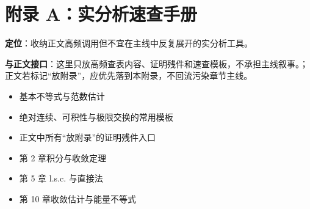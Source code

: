 \chapter{附录 A：实分析速查手册}

\label{app:a}

\begin{introduction}[内容提要]
        \item \textbf{定位}：收纳正文高频调用但不宜在主线中反复展开的实分析工具。
\item \textbf{与正文接口}：这里只放高频查表内容、证明残件和速查模板，不承担主线叙事。；正文若标记“放附录”，应优先落到本附录，不回流污染章节主线。
      \end{introduction}

\begin{definition}[收录范围]
        \begin{itemize}
  \item 基本不等式与范数估计
  \item 绝对连续、可积性与极限交换的常用模板
  \item 正文中所有“放附录”的证明残件入口
\end{itemize}
        \end{definition}

\begin{example}[使用时机]
        \begin{itemize}
  \item 第 2 章积分与收敛定理
  \item 第 5 章 l.s.c. 与直接法
  \item 第 10 章收敛估计与能量不等式
\end{itemize}
        \end{example}
